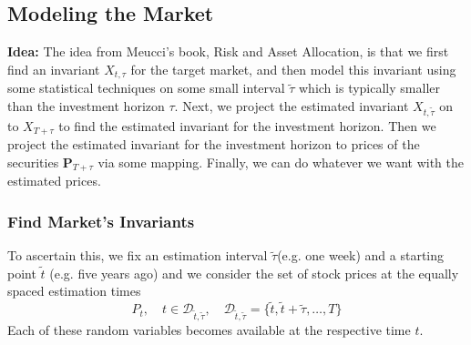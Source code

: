 \documentclass[13pt]{article}
\theoremstyle{definition}
\theoremstyle{remark}
\begin{document}
\subsection{Modeling the Market}
{\color{C6}\textbf{Idea:} The idea from Meucci's book, Risk and Asset Allocation, is that we first find an invariant $X_{t,\tau}$ for the target market, and then model this invariant using some statistical techniques on some small interval $\tilde{\tau}$ which is typically smaller than the investment horizon $\tau$. Next, we project the estimated invariant $X_{t,\tilde{\tau}}$ on to $X_{T+\tau}$ to find the estimated invariant for the investment horizon. Then we project the estimated invariant for the investment horizon to prices of the securities $\mathbf{P}_{T+\tau}$ via some mapping. Finally, we can do whatever we want with the estimated prices.}

\subsubsection{Find Market's Invariants}
To ascertain this, we fix an estimation interval $\tilde{\tau}$(e.g. one week) and a starting point $\tilde{t}$ (e.g. five years ago) and we consider the set of stock prices at the equally spaced estimation times 
$$
P_t, \quad t \in \mathcal{D}_{\tilde{t}, \widetilde{\tau}}, \quad \mathcal{D}_{\tilde{t}, \widetilde{\tau}}=\{\tilde{t}, \widetilde{t}+\widetilde{\tau}, \ldots, T\}
$$
Each of these random variables becomes available at the respective time $t$. 
\end{document}
